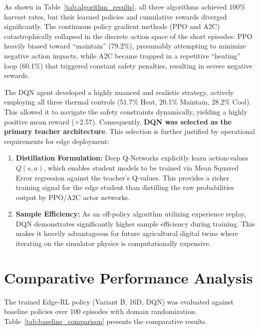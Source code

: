     As shown in Table~\ref{tab:algorithm_results}, all three algorithms achieved 100\% harvest rates, but their learned policies and cumulative rewards diverged significantly. The continuous policy gradient methods (PPO and A2C) catastrophically collapsed in the discrete action space of the short episodes: PPO heavily biased toward ``maintain'' (79.2\%), presumably attempting to minimize negative action impacts, while A2C became trapped in a repetitive ``heating'' loop (60.1\%) that triggered constant safety penalties, resulting in severe negative rewards.
    
    The DQN agent developed a highly nuanced and realistic strategy, actively employing all three thermal controls (51.7\% Heat, 20.1\% Maintain, 28.2\% Cool). This allowed it to navigate the safety constraints dynamically, yielding a highly positive mean reward (+2.57). Consequently, \textbf{DQN was selected as the primary teacher architecture}. This selection is further justified by operational requirements for edge deployment:
    
    \begin{enumerate}
        \item \textbf{Distillation Formulation:} Deep Q-Networks explicitly learn action-values $Q(s,a)$, which enables student models to be trained via Mean Squared Error regression against the teacher's Q-values. This provides a richer training signal for the edge student than distilling the raw probabilities output by PPO/A2C actor networks.
        \item \textbf{Sample Efficiency:} As an off-policy algorithm utilizing experience replay, DQN demonstrates significantly higher sample efficiency during training. This makes it heavily advantageous for future agricultural digital twins where iterating on the simulator physics is computationally expensive.
    \end{enumerate}



\section{Comparative Performance Analysis}
    \label{sec:Baseline Comparison}

    The trained Edge-RL policy (Variant B, 16D, DQN) was evaluated against baseline policies over 100 episodes with domain randomization. Table~\ref{tab:baseline_comparison} presents the comparative results.

